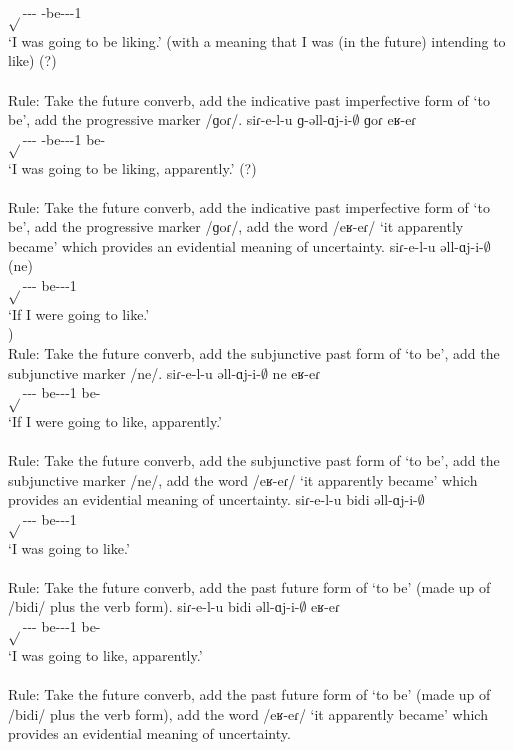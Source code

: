\begin{exe}
\begin{xlist}
		$\sqrt{}$-{\thgloss}-{\infgloss}-{\futcvb} {\ind}-be-{\thgloss}-{\pst}-1{\sg} {\prog} \\
		\trans `I was going to be liking.' (with a meaning that I was (in the future) intending to like) (?) \\
		 \\
		Rule: Take the future converb, add the indicative past imperfective form of `to be', add the progressive marker /ɡoɾ/. 
		\ex \gll siɾ-e-l-u ɡ-əll-ɑj-i-$\emptyset$ ɡoɾ eʁ-eɾ \\
		$\sqrt{}$-{\thgloss}-{\infgloss}-{\futcvb} {\ind}-be-{\thgloss}-{\pst}-1{\sg} {\prog} be-{\eptcp} \\
		\trans `I was going to be liking, apparently.' (?) \\
		 \\
		Rule: Take the future converb, add the indicative past imperfective form of `to be', add the progressive marker /ɡoɾ/, add the word /eʁ-eɾ/ `it apparently became' which provides an evidential meaning of uncertainty.
		\ex \gll siɾ-e-l-u əll-ɑj-i-$\emptyset$ (ne) \\
		$\sqrt{}$-{\thgloss}-{\infgloss}-{\futcvb} be-{\thgloss}-{\pst}-1{\sg} {\sbjv} \\
		\trans `If I were going to like.' \\
		) \\
		Rule: Take the future converb, add the subjunctive past form of `to be', add the subjunctive marker /ne/.
		\ex \gll siɾ-e-l-u əll-ɑj-i-$\emptyset$ ne eʁ-eɾ \\
		$\sqrt{}$-{\thgloss}-{\infgloss}-{\futcvb} be-{\thgloss}-{\pst}-1{\sg} {\sbjv} be-{\eptcp} \\
		\trans `If I were going to like, apparently.' \\
		 \\
		Rule: Take the future converb, add the subjunctive past form of `to be', add the subjunctive marker /ne/, add the word /eʁ-eɾ/ `it apparently became' which provides an evidential meaning of uncertainty.
		\ex \gll siɾ-e-l-u bidi əll-ɑj-i-$\emptyset$ \\
		$\sqrt{}$-{\thgloss}-{\infgloss}-{\futcvb} {\futcvb} be-{\thgloss}-{\pst}-1{\sg} \\
		\trans `I was going to like.' \\
		 \\
		Rule: Take the future converb, add the past future form of `to be' (made up of /bidi/ plus the verb form). 
		\ex \gll siɾ-e-l-u bidi əll-ɑj-i-$\emptyset$ eʁ-eɾ \\
		$\sqrt{}$-{\thgloss}-{\infgloss}-{\futcvb} {\futcvb} be-{\thgloss}-{\pst}-1{\sg} be-{\eptcp} \\
		\trans `I was going to like, apparently.' \\
		 \\
		Rule: Take the future converb, add the past future form of `to be' (made up of /bidi/ plus the verb form), add the word /eʁ-eɾ/ `it apparently became' which provides an evidential meaning of uncertainty. 
 

\end{xlist}
\end{exe}
